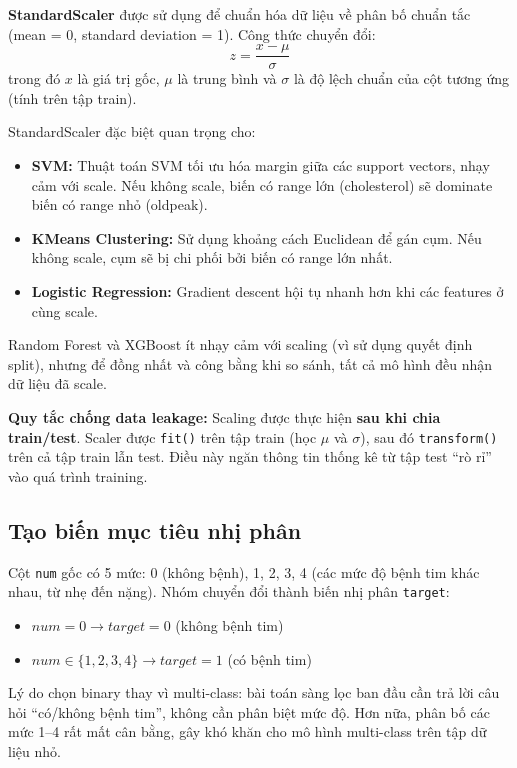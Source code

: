 \textbf{StandardScaler} được sử dụng để chuẩn hóa dữ liệu về phân bố chuẩn tắc (mean = 0, standard deviation = 1). Công thức chuyển đổi:
\[
z = \frac{x - \mu}{\sigma}
\]
trong đó $x$ là giá trị gốc, $\mu$ là trung bình và $\sigma$ là độ lệch chuẩn của cột tương ứng (tính trên tập train).

StandardScaler đặc biệt quan trọng cho:
\begin{itemize}
    \item \textbf{SVM:} Thuật toán SVM tối ưu hóa margin giữa các support vectors, nhạy cảm với scale. Nếu không scale, biến có range lớn (cholesterol) sẽ dominate biến có range nhỏ (oldpeak).
    \item \textbf{KMeans Clustering:} Sử dụng khoảng cách Euclidean để gán cụm. Nếu không scale, cụm sẽ bị chi phối bởi biến có range lớn nhất.
    \item \textbf{Logistic Regression:} Gradient descent hội tụ nhanh hơn khi các features ở cùng scale.
\end{itemize}

Random Forest và XGBoost ít nhạy cảm với scaling (vì sử dụng quyết định split), nhưng để đồng nhất và công bằng khi so sánh, tất cả mô hình đều nhận dữ liệu đã scale.

\textbf{Quy tắc chống data leakage:} Scaling được thực hiện \textbf{sau khi chia train/test}. Scaler được \texttt{fit()} trên tập train (học $\mu$ và $\sigma$), sau đó \texttt{transform()} trên cả tập train lẫn test. Điều này ngăn thông tin thống kê từ tập test ``rò rỉ'' vào quá trình training.

\subsection{Tạo biến mục tiêu nhị phân}

Cột \texttt{num} gốc có 5 mức: 0 (không bệnh), 1, 2, 3, 4 (các mức độ bệnh tim khác nhau, từ nhẹ đến nặng). Nhóm chuyển đổi thành biến nhị phân \texttt{target}:
\begin{itemize}
    \item $num = 0 \rightarrow target = 0$ (không bệnh tim)
    \item $num \in \{1, 2, 3, 4\} \rightarrow target = 1$ (có bệnh tim)
\end{itemize}

Lý do chọn binary thay vì multi-class: bài toán sàng lọc ban đầu cần trả lời câu hỏi ``có/không bệnh tim'', không cần phân biệt mức độ. Hơn nữa, phân bố các mức 1--4 rất mất cân bằng, gây khó khăn cho mô hình multi-class trên tập dữ liệu nhỏ.

